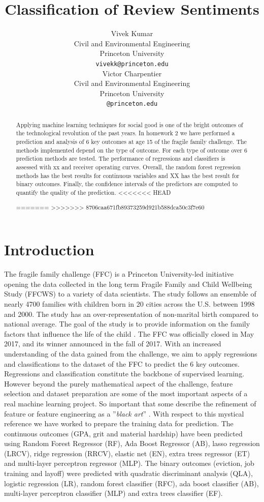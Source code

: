 \documentclass{article} %
\title{Classification of Review Sentiments}
\author{
Vivek Kumar\\
Civil and Environmental Engineering\\
Princeton University\\
\texttt{vivekk@princeton.edu} \\
\And
Victor Charpentier\\
Civil and Environmental Engineering\\
Princeton University\\
\texttt{@princeton.edu} \\
}
\begin{document}
\maketitle

\begin{abstract}
Applying machine learning techniques for social good is one of the bright outcomes of the technological revolution of the past years. In homework 2 we have performed a prediction and analysis of 6 key outcomes at age 15 of the fragile family challenge. The methods implemented depend on the type of outcome. For each type of outcome over 6 prediction methods are tested. The performance of regressions and classifiers is assessed with xx and receiver operating curves. Overall, the random forest regression methods has the best results for continuous variables and XX has the best result for binary outcomes. Finally, the confidence intervals of the predictors are computed to quantify the quality of the prediction.
<<<<<<< HEAD

=======
>>>>>>> 8706caa671fb89373259d921b588dca50c3f7e60
\end{abstract}

\section{Introduction}
The fragile family challenge (FFC) is a Princeton University-led initiative opening the data collected in the long term Fragile Family and Child Wellbeing Study (FFCWS) to a variety of data scientists. The study follows an ensemble of nearly 4700 families with children born in 20 cities across the U.S. between 1998 and 2000. The study has an over-representation of non-marital birth compared to national average. The goal of the study is to provide information on the family factors that influence the life of the child  \cite{reichman2001fragile}. The FFC was officially closed in May 2017, and its winner announced in the fall of 2017. 
With an increased understanding of the data gained from the challenge, we aim to apply regressions and classifications to the dataset of the FFC to predict the 6 key outcomes. Regressions and classification constitute the backbone of supervised learning. However beyond the purely mathematical aspect of the challenge, feature selection and dataset preparation are some of the most important aspects of a real machine learning project. So important that some describe the refinement of feature or feature engineering as a ''\textit{black art}'' \cite{domingos2012few}. With respect to this mystical reference we have worked to prepare the training data for prediction. The continuous outcomes (GPA, grit and material hardship) have been predicted using Random Forest Regressor (RF), Ada Boost Regressor (AB), lasso regression (LRCV), ridge regression (RRCV), elastic net (EN), extra trees regressor (ET) and multi-layer perceptron regressor (MLP). The binary outcomes (eviction, job training and layoff) were predicted with quadratic discriminant analysis (QLA), logistic regression (LR), random forest classifier (RFC), ada boost classifier (AB),  multi-layer perceptron classifier (MLP) and extra trees classifier (EF).
\end{document}
